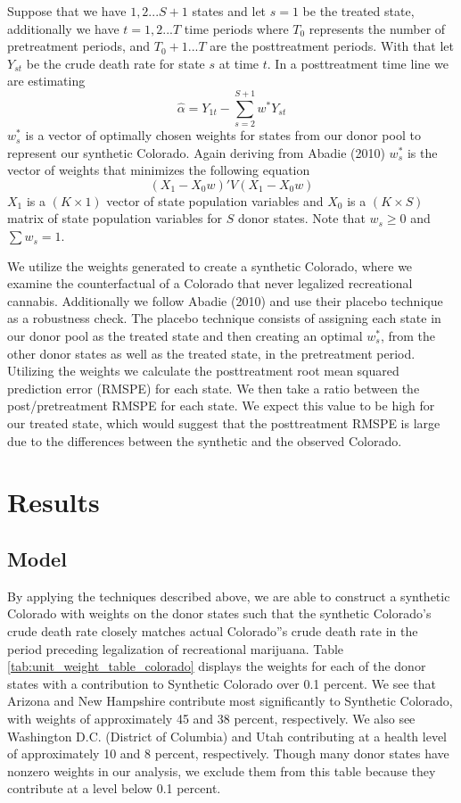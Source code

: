 \documentclass{article}
\begin{document}
Suppose that we have $1,2...S+1$ states and let $s = 1$ be the treated state, additionally we have $t = 1,2...T$ time periods where $T_0$ represents the number of pretreatment periods, and $T_0 + 1...T$ are the posttreatment periods. With that let $Y_{st}$ be the crude death rate for state $s$ at time $t$. In a posttreatment time line we are estimating
\begin{equation*}
\hat{\alpha} = Y_{1t} - \sum_{s=2}^{S+1}w^{*}Y_{st}
\end{equation*}
$w^{*}_s$ is a vector of optimally chosen weights for states from our donor pool to represent our synthetic Colorado. Again deriving from Abadie (2010) $w^{*}_s$ is the vector of weights that minimizes the following equation
\begin{equation*}
(X_1 - X_0w)'V(X_1 - X_0w)
\end{equation*}
$X_1$ is a $(K \times 1)$ vector of state population variables and $X_0$ is a $(K \times S)$ matrix of state population variables for $S$ donor states. Note that $w_s \geq 0$ and $\sum w_s = 1$.

We utilize the weights generated to create a synthetic Colorado, where we examine the counterfactual of a Colorado that never legalized recreational cannabis. Additionally we follow Abadie (2010) and use their placebo technique as a robustness check. The placebo technique consists of assigning each state in our donor pool as the treated state and then creating an optimal $w^{*}_s$, from the other donor states as well as the treated state, in the pretreatment period. Utilizing the weights we calculate the posttreatment root mean squared prediction error (RMSPE) for each state. We then take a ratio between the post/pretreatment RMSPE for each state. We expect this value to be high for our treated state, which would suggest that the posttreatment RMSPE is large due to the differences between the synthetic and the observed Colorado.

\section{Results}

\subsection{Model}

By applying the techniques described above, we are able to construct a synthetic Colorado with weights on the donor states such that the synthetic Colorado's crude death rate closely matches actual Colorado''s crude death rate in the period preceding legalization of recreational marijuana. Table \ref{tab:unit_weight_table_colorado} displays the weights for each of the donor states with a contribution to Synthetic Colorado over 0.1 percent. We see that Arizona and New Hampshire contribute most significantly to Synthetic Colorado, with weights of approximately 45 and 38 percent, respectively. We also see Washington D.C. (District of Columbia) and Utah contributing at a health level of approximately 10 and 8 percent, respectively. Though many donor states have nonzero weights in our analysis, we exclude them from this table because they contribute at a level below 0.1 percent.
\end{document}

